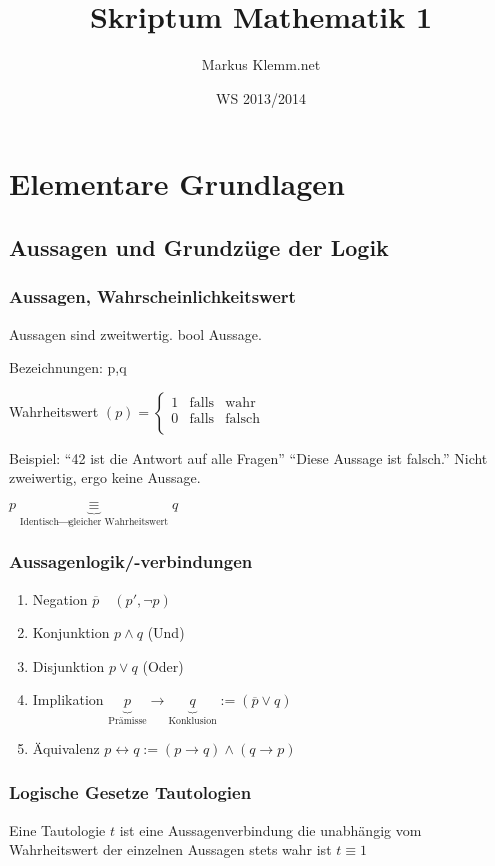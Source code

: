 \documentclass[a4paper]{scrartcl}
\title{Skriptum Mathematik 1}
\date{WS 2013/2014}
\author{Markus Klemm.net}
\begin{document}
\maketitle

\tableofcontents

\section{Elementare Grundlagen}
\subsection{Aussagen und Grundzüge der Logik}
\subsubsection{Aussagen, Wahrscheinlichkeitswert}
Aussagen sind zweitwertig. bool Aussage.

Bezeichnungen: p,q

Wahrheitswert $(p) =\left\{ \begin{array}{rcl}
         1
         & \mbox{falls}
         & \text{wahr} \\ 
         0  
         & \mbox{falls} 
         & \text{falsch} \\
                \end{array}\right.
                $

Beispiel: 
"`42 ist die Antwort auf alle Fragen"'
"`Diese Aussage ist falsch."' Nicht zweiwertig, ergo keine Aussage.

$p \underbrace{\equiv}_{\text{Identisch} \rightarrow \text{gleicher Wahrheitswert}} q$
\subsubsection{Aussagenlogik/-verbindungen}
\begin{enumerate}
\item Negation $\overline{p} \quad (p' , \neg p )$
\item Konjunktion $p \wedge q$ (Und)
\item Disjunktion $p \vee q$ (Oder)
\item Implikation $\underbrace{p}_{\text{Prämisse}} \rightarrow \underbrace{q}_{\text{Konklusion}} := (\overline{p} \vee q)$
\item Äquivalenz $p \leftrightarrow q := (p\rightarrow q) \wedge (q \rightarrow p)$
\end{enumerate}
\subsubsection{Logische Gesetze Tautologien}
Eine Tautologie $t$ ist eine Aussagenverbindung die unabhängig vom Wahrheitswert der einzelnen Aussagen stets wahr ist $t \equiv 1$
\end{document}
